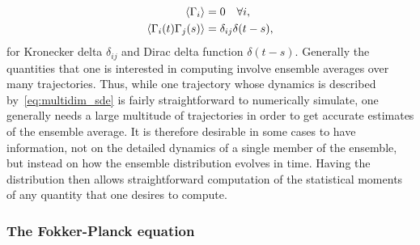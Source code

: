 \documentclass[10pt]{article}
\begin{document}
\begin{subequations}
    \begin{align}
        \ev{\Gamma_{i}} &= 0\quad \forall i,\\
        \ev{\Gamma_{i}(t)\Gamma_{j}(s)} &= \delta_{ij}\delta(t-s),
    \end{align}
\end{subequations}
for Kronecker delta $\delta_{ij}$ and Dirac delta function $\delta(t-s)$. Generally the quantities that one is interested in computing involve ensemble averages over many trajectories. Thus, while one trajectory whose dynamics is described by~\eqref{eq:multidim_sde} is fairly straightforward to numerically simulate, one generally needs a large multitude of trajectories in order to get accurate estimates of the ensemble average. It is therefore desirable in some cases to have information, not on the detailed dynamics of a single member of the ensemble, but instead on how the ensemble distribution evolves in time. Having the distribution then allows straightforward computation of the statistical moments of any quantity that one desires to compute.

\subsubsection{The Fokker-Planck equation}
\end{document}
